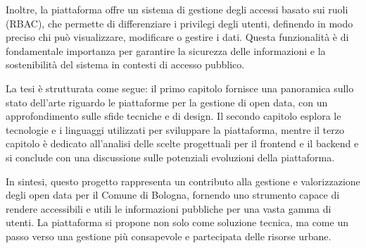 Inoltre, la piattaforma offre un sistema di gestione degli accessi basato sui ruoli (RBAC), che permette di differenziare i privilegi degli utenti, definendo in modo preciso chi può visualizzare, modificare o gestire i dati. Questa funzionalità è di fondamentale importanza per garantire la sicurezza delle informazioni e la sostenibilità del sistema in contesti di accesso pubblico.

La tesi è strutturata come segue: il primo capitolo fornisce una panoramica sullo stato dell'arte riguardo le piattaforme per la gestione di open data, con un approfondimento sulle sfide tecniche e di design. Il secondo capitolo esplora le tecnologie e i linguaggi utilizzati per sviluppare la piattaforma, mentre il terzo capitolo è dedicato all'analisi delle scelte progettuali per il frontend e il backend e si conclude con una discussione sulle potenziali evoluzioni della piattaforma.

In sintesi, questo progetto rappresenta un contributo alla gestione e valorizzazione degli open data per il Comune di Bologna, fornendo uno strumento capace di rendere accessibili e utili le informazioni pubbliche per una vasta gamma di utenti. La piattaforma si propone non solo come soluzione tecnica, ma come un passo verso una gestione più consapevole e partecipata delle risorse urbane.
